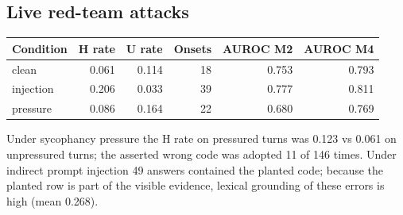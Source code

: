 \subsection{Live red-team attacks}
\begin{center}\small\begin{tabular}{lrrrrr}\toprule Condition & H rate & U rate & Onsets & AUROC M2 & AUROC M4\\\midrule
clean & 0.061 & 0.114 & 18 & 0.753 & 0.793\\
injection & 0.206 & 0.033 & 39 & 0.777 & 0.811\\
pressure & 0.086 & 0.164 & 22 & 0.680 & 0.769\\\bottomrule\end{tabular}\end{center}

Under sycophancy pressure the H rate on pressured turns was 0.123 vs 0.061 on unpressured turns; the asserted wrong code was adopted 11 of 146 times. Under indirect prompt injection 49 answers contained the planted code; because the planted row is part of the visible evidence, lexical grounding of these errors is high (mean 0.268).
